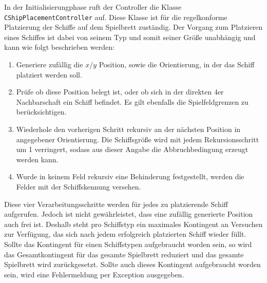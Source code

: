In der Initialisierungphase ruft der Controller die Klasse \texttt{CShip\-Place\-ment\-Con\-trol\-ler} auf.
Diese Klasse ist für die regelkonforme Platzierung der Schiffe auf dem Spielbrett zuständig.
Der Vorgang zum Platzieren eines Schiffes ist dabei von seinem Typ und somit seiner Größe unabhängig und kann wie folgt beschrieben werden:
\begin{enumerate}
	\item Generiere zufällig die $x/y$ Position, sowie die Orientierung, in der das Schiff platziert werden soll.
	\item Prüfe ob diese Position belegt ist, oder ob sich in der direkten 4er Nachbarschaft ein Schiff befindet. 
	Es gilt ebenfalls die Spielfeldgrenzen zu berücksichtigen.
	\item Wiederhole den vorherigen Schritt rekursiv an der nächsten Position in angegebener Orientierung. 
	Die Schiffsgröße wird mit jedem Rekursionsschritt um 1 verringert, sodass aus dieser Angabe die Abbruchbedingung erzeugt werden kann.
	\item Wurde in keinem Feld rekursiv eine Behinderung festgestellt, werden die Felder mit der Schiffskennung versehen.
\end{enumerate}
Diese vier Verarbeitungsschritte werden für jedes zu platzierende Schiff aufgerufen.
Jedoch ist nicht gewährleistet, dass eine zufällig generierte Position auch frei ist.
Deshalb steht pro Schiffstyp ein maximales Kontingent an Versuchen zur Verfügung, das sich nach jedem erfolgreich platzierten Schiff wieder füllt.
Sollte das Kontingent für einen Schiffstypen aufgebraucht worden sein, so wird das Gesamtkontingent für das gesamte Spielbrett reduziert und das gesamte Spielbrett wird zurückgesetzt.
Sollte auch dieses Kontingent aufgebraucht worden sein, wird eine Fehlermeldung per Exception ausgegeben.